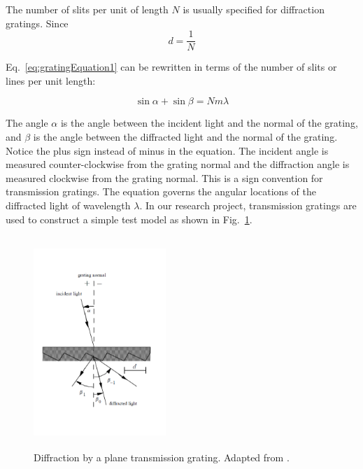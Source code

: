 \documentclass[aps,twocolumn,twoside,secnumarabic,balancelastpage,amsmath,amssymb,nofootinbib,hyperref=pdftex]{revtex4}
\begin{document}
The number of slits per unit of length $N$ is usually specified for diffraction gratings.
Since
\begin{equation}
   d = \frac{1}{N}
   \label{eq:grSp1}
\end{equation}

Eq.~\ref{eq:gratingEquation1} can be rewritten in terms of the number of slits or lines per unit length:

\begin{equation}
   \sin{\alpha}+\sin{\beta}=Nm\lambda 
   \label{eq:gratingEquationwrN}
\end{equation}

The angle $\alpha$ is the angle between the incident light and the normal of the grating, and $\beta$ is the angle between the diffracted light and the normal of the grating. Notice the plus sign instead of minus in the equation. The incident angle is measured counter-clockwise from the grating normal and the diffraction angle is measured clockwise from the grating normal. This is a sign convention for transmission gratings. The equation governs the angular locations of the diffracted light of wavelength $\lambda$. In our research project, transmission gratings are used to construct a simple test model as shown in Fig.~\ref{fig:tr_gr}.

\begin{figure}[htb]
\includegraphics[width=5cm, height=8cm]{tr_gr_angles}
\caption{Diffraction by a plane transmission grating. Adapted from \cite{Palmer2005}.
\label{fig:tr_gr}}
\end{figure}

\end{document}
